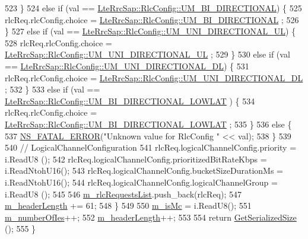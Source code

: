 \begin{DoxyCode}
523     \}
524     \textcolor{keywordflow}{else} \textcolor{keywordflow}{if} (val == \hyperlink{structns3_1_1LteRrcSap_1_1RlcConfig_ab6ab94ca4abaf717926f31db4dddc61ba55368feac1627138969235809e6eedc5}{LteRrcSap::RlcConfig::UM\_BI\_DIRECTIONAL}) \{
525       rlcReq.rlcConfig.choice = \hyperlink{structns3_1_1LteRrcSap_1_1RlcConfig_ab6ab94ca4abaf717926f31db4dddc61ba55368feac1627138969235809e6eedc5}{LteRrcSap::RlcConfig::UM\_BI\_DIRECTIONAL}
      ;
526     \}
527     \textcolor{keywordflow}{else} \textcolor{keywordflow}{if} (val == \hyperlink{structns3_1_1LteRrcSap_1_1RlcConfig_ab6ab94ca4abaf717926f31db4dddc61ba590c05a82e744bfb87986d444da6f4e8}{LteRrcSap::RlcConfig::UM\_UNI\_DIRECTIONAL\_UL})
       \{
528       rlcReq.rlcConfig.choice = \hyperlink{structns3_1_1LteRrcSap_1_1RlcConfig_ab6ab94ca4abaf717926f31db4dddc61ba590c05a82e744bfb87986d444da6f4e8}{LteRrcSap::RlcConfig::UM\_UNI\_DIRECTIONAL\_UL}
      ;
529     \}
530     \textcolor{keywordflow}{else} \textcolor{keywordflow}{if} (val == \hyperlink{structns3_1_1LteRrcSap_1_1RlcConfig_ab6ab94ca4abaf717926f31db4dddc61ba5d389f5f1231591496fe6e143e8f1ddf}{LteRrcSap::RlcConfig::UM\_UNI\_DIRECTIONAL\_DL})
       \{
531       rlcReq.rlcConfig.choice = \hyperlink{structns3_1_1LteRrcSap_1_1RlcConfig_ab6ab94ca4abaf717926f31db4dddc61ba5d389f5f1231591496fe6e143e8f1ddf}{LteRrcSap::RlcConfig::UM\_UNI\_DIRECTIONAL\_DL}
      ;
532     \}
533     \textcolor{keywordflow}{else} \textcolor{keywordflow}{if} (val == \hyperlink{structns3_1_1LteRrcSap_1_1RlcConfig_ab6ab94ca4abaf717926f31db4dddc61bae193e49db4401a2b88cfc0f3d782f9d8}{LteRrcSap::RlcConfig::UM\_BI\_DIRECTIONAL\_LOWLAT}
      ) \{
534       rlcReq.rlcConfig.choice = \hyperlink{structns3_1_1LteRrcSap_1_1RlcConfig_ab6ab94ca4abaf717926f31db4dddc61bae193e49db4401a2b88cfc0f3d782f9d8}{LteRrcSap::RlcConfig::UM\_BI\_DIRECTIONAL\_LOWLAT}
      ;
535     \}
536     \textcolor{keywordflow}{else} \{
537       \hyperlink{group__fatal_ga5131d5e3f75d7d4cbfd706ac456fdc85}{NS\_FATAL\_ERROR}(\textcolor{stringliteral}{"Unknown value for RlcConfig "} << val);
538     \}
539 
540     \textcolor{comment}{// LogicalChannelConfiguration}
541     rlcReq.logicalChannelConfig.priority = i.ReadU8     ();
542     rlcReq.logicalChannelConfig.prioritizedBitRateKbps = i.ReadNtohU16();
543     rlcReq.logicalChannelConfig.bucketSizeDurationMs = i.ReadNtohU16();
544     rlcReq.logicalChannelConfig.logicalChannelGroup = i.ReadU8     ();
545 
546     \hyperlink{classns3_1_1EpcX2HandoverRequestHeader_ac480cbca8380b8667096efeac4e2fa0c}{m\_rlcRequestsList}.push\_back(rlcReq);
547     \hyperlink{classns3_1_1EpcX2HandoverRequestHeader_a4b119b64b283c261afa23ca597627a03}{m\_headerLength} += 61;
548   \}
549 
550   \hyperlink{classns3_1_1EpcX2HandoverRequestHeader_a2195d578c9065fa66c045243eeeed7c7}{m\_isMc} = i.ReadU8();
551   \hyperlink{classns3_1_1EpcX2HandoverRequestHeader_a7888e6bf90c8f00712a683bc28c513aa}{m\_numberOfIes}++;
552   \hyperlink{classns3_1_1EpcX2HandoverRequestHeader_a4b119b64b283c261afa23ca597627a03}{m\_headerLength}++;
553 
554   \textcolor{keywordflow}{return} \hyperlink{classns3_1_1EpcX2HandoverRequestHeader_a68606629133183008b56871ae8b9f903}{GetSerializedSize} ();
555 \}
\end{DoxyCode}


